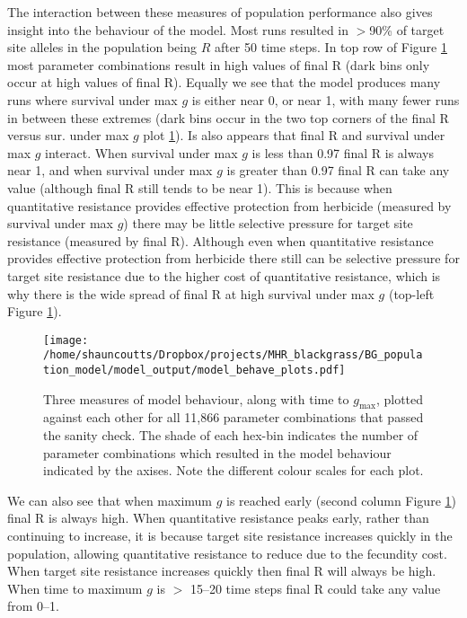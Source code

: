 \documentclass[12pt,a4paper]{article}
\begin{document}
The interaction between these measures of population performance also gives insight into the behaviour of the model. Most runs resulted in $>$90\% of target site alleles in the population being $R$ after 50 time steps. In top row of Figure \ref{fig:hexbins} most parameter combinations result in high values of final R (dark bins only occur at high values of final R). Equally we see that the model produces many runs where survival under max $g$ is either near 0, or near 1, with many fewer runs in between these extremes (dark bins occur in the two top corners of the final R versus sur. under max $g$ plot \ref{fig:hexbins}). Is also appears that final R and survival under max $g$ interact. When survival under max $g$ is less than 0.97 final R is always near 1, and when survival under max $g$ is greater than 0.97 final R can take any value (although final R still tends to be near 1). This is because when quantitative resistance provides effective protection from herbicide (measured by survival under max $g$) there may be little selective pressure for target site resistance (measured by final R). Although even when quantitative resistance provides effective protection from herbicide there still can be selective pressure for target site resistance due to the higher cost of quantitative resistance, which is why there is the wide spread of final R at high survival under max $g$ (top-left Figure \ref{fig:hexbins}). 

\begin{figure}[H] 
	\centering
	\texttt{[image: /home/shauncoutts/Dropbox/projects/MHR\_blackgrass/BG\_population\_model/model\_output/model\_behave\_plots.pdf]}
	\caption{Three measures of model behaviour, along with time to $g_\text{max}$, plotted against each other for all 11,866 parameter combinations that passed the sanity check. The shade of each hex-bin indicates the number of parameter combinations which resulted in the model behaviour indicated by the axises. Note the different colour scales for each plot.}
	\label{fig:hexbins}
\end{figure}

We can also see that when maximum $g$ is reached early (second column Figure \ref{fig:hexbins}) final R is always high. When quantitative resistance peaks early, rather than continuing to increase, it is because target site resistance increases quickly in the population, allowing quantitative resistance to reduce due to the fecundity cost. When target site resistance increases quickly then final R will always be high. When time to maximum $g$ is $>$ 15--20 time steps final R could take any value from 0--1.  
\end{document}
